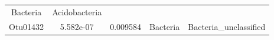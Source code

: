 \documentclass[]{article}
\begin{document}
\begin{longtable}[]{@{}ccccc@{}}
\begin{minipage}[t]{0.13\columnwidth}
Bacteria\strut
\end{minipage} & \begin{minipage}[t]{0.27\columnwidth}\centering\strut
Acidobacteria\strut
\end{minipage}\tabularnewline
\begin{minipage}[t]{0.13\columnwidth}\centering\strut
Otu01432\strut
\end{minipage} & \begin{minipage}[t]{0.14\columnwidth}\centering\strut
5.582e-07\strut
\end{minipage} & \begin{minipage}[t]{0.13\columnwidth}\centering\strut
0.009584\strut
\end{minipage} & \begin{minipage}[t]{0.13\columnwidth}\centering\strut
Bacteria\strut
\end{minipage} & \begin{minipage}[t]{0.27\columnwidth}\centering\strut
Bacteria\_unclassified\strut
\end{minipage}\tabularnewline
\bottomrule
\end{longtable}
\end{document}
